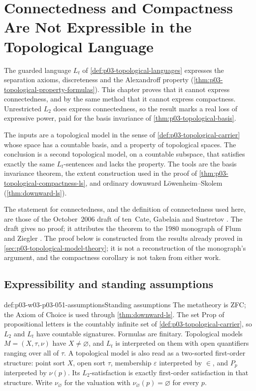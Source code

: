 \chapter{Connectedness and Compactness Are Not Expressible in the Topological Language}
\label{sec:p03-w03-p03-051-nondefinability}

The guarded language \(L_t\) of \cref{def:p03-topological-languages}
expresses the separation axioms, discreteness and the Alexandroff property
(\cref{thm:p03-topological-property-formulas}). This chapter proves that it
cannot express connectedness, and by the same method that it cannot express
compactness. Unrestricted \(L_2\) does express connectedness, so the result
marks a real loss of expressive power, paid for the basis invariance of
\cref{thm:p03-topological-basis}.

The inputs are a topological model in the sense of
\cref{def:p03-topological-carrier} whose space has a countable basis, and a
property of topological spaces. The conclusion is a second topological
model, on a countable subspace, that satisfies exactly the same
\(L_t\)-sentences and lacks the property. The tools are the basis
invariance theorem, the extent construction used in the proof of
\cref{thm:p03-topological-compactness-ls}, and ordinary downward
L\"owenheim--Skolem (\cref{thm:downward-ls}).

The statement for connectedness, and the definition of connectedness
used here, are those of the October~2006 draft of ten~Cate,
Gabelaia and Sustretov
\cite[Definition~13, p.~11; Theorem~2.9, p.~12]{TenCateGabelaiaSustretov2006TopologyDraft}.
The draft gives no proof; it attributes the theorem to the 1980 monograph
of Flum and Ziegler \cite{FlumZiegler1980TopologicalModelTheory}. The
proof below is constructed from the results already proved in
\cref{sec:p03-topological-model-theory}; it is not a reconstruction of the
monograph's argument, and the compactness corollary is not taken from either
work.

\section{Expressibility and standing assumptions}
\label{sec:p03-w03-p03-051-expressibility}

\begin{hbconvention}{def:p03-w03-p03-051-assumptions}{Standing assumptions}
The metatheory is ZFC; the Axiom of Choice is used through
\cref{thm:downward-ls}. The set \(\mathrm{Prop}\) of propositional
letters is the countably infinite set of
\cref{def:p03-topological-carrier}, so \(L_2\) and \(L_t\) have countable
signatures. Formulas are finitary. Topological models
\(M=(X,\tau,\nu)\) have \(X\ne\varnothing\), and \(L_t\) is interpreted
on them with open quantifiers ranging over all of \(\tau\). A topological
model is also read as a two-sorted first-order structure: point sort
\(X\), open sort \(\tau\), membership \(\varepsilon\) interpreted by
\(\in\), and \(P_p\) interpreted by \(\nu(p)\). Its \(L_2\)-satisfaction
is exactly first-order satisfaction in that structure. Write
\(\nu_\varnothing\) for the valuation with \(\nu_\varnothing(p)=\varnothing\)
for every \(p\).
\end{hbconvention}

